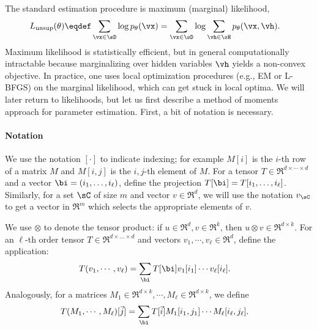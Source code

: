 The standard estimation procedure is maximum (marginal) likelihood,
  \begin{align*}
    L_\text{unsup}(\theta) &\eqdef \sum_{\vx \in \sD} \log p_\theta(\vx)
        =  \sum_{\vx \in \sD} \log \sum_{\vh \in \sH} p_\theta(\vx,\vh).
  \end{align*}
  Maximum likelihood is statistically efficient,
  but in general computationally intractable
  because marginalizing over hidden variables $\vh$ yields a non-convex objective.
In practice, one uses local optimization procedures (e.g., EM
  or L-BFGS) on the marginal likelihood, which can get stuck in local
  optima.
We will later return to likelihoods, but let us first
describe a method of moments approach for parameter estimation.
First, a bit of notation is necessary.

\paragraph{Notation}

We use the notation $[\cdot]$ to indicate indexing; for example $M[i]$
  is the $i$-th row of a matrix $M$ and $M[i,j]$ is the $i,j$-th element
  of $M$.
For a tensor $T \in \Re^{d \times \cdots \times d}$ and a vector $\bi
  = (i_1, \ldots, i_\ell)$, define the projection $T[\bi] = T[i_1, \ldots, i_\ell]$.
Similarly, for a set $\sC$ of size $m$ and vector $v \in \Re^d$, we
  will use the notation $v_\sC$ to get a vector in $\Re^m$ which selects
  the appropriate elements of $v$.

We use $\otimes$ to denote the tensor product: if $u \in \Re^d,
  v \in \Re^k$, then $u \otimes v \in \Re^{d \times k}$.
For an $\ell$-th order tensor $T \in \Re^{d \times \ldots \times
  d}$ and vectors $v_1, \cdots, v_\ell \in \Re^{d}$, define 
  the application:
\begin{align*}
  T(v_1, \cdots, v_\ell) 
  &= \sum_{\bi}
            T[\bi] v_1[i_1] \cdots v_\ell[i_\ell].
\end{align*}
Analogously, for a matrices $M_1 \in \Re^{d \times k}, \cdots,
  M_\ell \in \Re^{d \times k}$, we define
\begin{align*}
  T(M_1, \cdots, M_\ell)[\vec j]
  &= \sum_{\bi}
            T[\vec i] {M_1}[i_1,j_1] \cdots M_\ell[i_\ell, j_\ell].
\end{align*}

